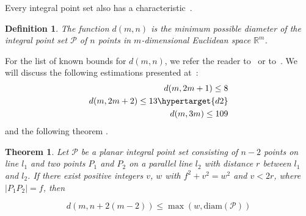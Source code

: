 \documentclass[12pt]{article}
\theoremstyle{theorem}
\newtheorem{theorem}{Theorem}
\theoremstyle{dfn}
\newtheorem{dfn}{Definition}
\theoremstyle{remark}
\begin{document}
Every integral point set also has a characteristic~\cite{kemnitz1988punktmengen,kurz2005characteristic}.









\begin{dfn}
	The function $d(m, n)$ is the minimum possible diameter of
	the integral point set $\mathcal{P}$ of $n$ points in
	$m$-dimensional Euclidean space $\mathbb{R}^{m}$.
\end{dfn}


%


For the list of known bounds for $d(m, n)$,
we refer the reader to~\cite[Theorem 1]{kurz2008bounds} or to~\cite{our-vmmsh-2018}.
We will discuss the following estimations presented at~\cite{kurz2008bounds}:
\begin{align}
	d(m, 2m + 1) \leq 8\\
	d(m, 2m + 2) \leq 13 \hypertarget{d2}\\
	d(m, 3m) \leq 109
\end{align}
and the following theorem \cite[Theorem 2.1]{kurz2008bounds}.

\begin{theorem}
	Let $\mathcal{P}$ be a planar integral point set consisting of
	$n - 2$ points on line $l_1$ and two points $P_{1}$ and $P_{2}$ on a
	parallel line $l_2$ with distance $r$ between $l_{1}$ and $l_{2}$. If there
	exist positive integers $v$, $w$ with $f^{2} + v^{2}
	= w^{2}$ and $v < 2r$, where $|P_{1}P_{2}| = f$,
	then

	\begin{equation}\label{formula1}
		d(m, n + 2(m - 2)) \leq \max(w, \operatorname{diam(\mathcal{P})})
	\end{equation}

\end{theorem}
\end{document}
